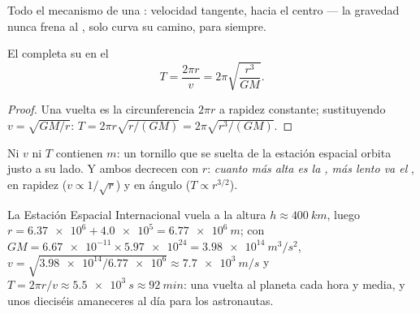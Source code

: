 \begin{omfigure}

{\small Todo el mecanismo de una : velocidad tangente,  hacia el centro
--- la gravedad nunca frena al , solo curva su camino, para siempre.}
\end{omfigure}

\begin{proposition}\label{prop:g12:satellites-kepler:period}
El  completa su  en el 
\[ T = \frac{2\pi r}{v} = 2\pi \sqrt{\frac{r^3}{G M}}. \]
\end{proposition}

\begin{proof}
Una vuelta es la circunferencia $2\pi r$ a rapidez constante; sustituyendo
$v = \sqrt{GM/r}$: $T = 2\pi r\sqrt{r/(GM)} = 2\pi\sqrt{r^3/(GM)}$.
\end{proof}

Ni $v$ ni $T$ contienen $m$: un tornillo que se suelta de la estación espacial orbita
justo a su lado. Y ambos decrecen con $r$: \emph{cuanto más alta es la , más
lento va el }, en rapidez ($v \propto 1/\sqrt r$) y en ángulo
($T \propto r^{3/2}$).

\begin{example}\label{ex:g12:satellites-kepler:iss}
La Estación Espacial Internacional vuela a la altura $h \approx \qty{400}{km}$, luego
$r = \num{6.37e6} + \num{4.0e5} = \qty{6.77e6}{m}$; con
$GM = \num{6.67e-11} \times \num{5.97e24} = \qty{3.98e14}{m^3/s^2}$,
$v = \sqrt{\num{3.98e14}/\num{6.77e6}} \approx \qty{7.7e3}{m/s}$ y
$T = 2\pi r/v \approx \qty{5.5e3}{s} \approx \qty{92}{min}$: una vuelta al planeta cada
hora y media, y unos dieciséis amaneceres al día para los astronautas.
\end{example}


